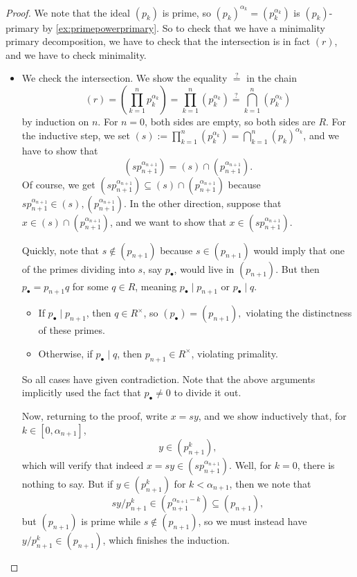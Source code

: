 \begin{proof}
	We note that the ideal $(p_k)$ is prime, so $(p_k)^{\alpha_k}=(p_k^{\alpha_k})$ is $(p_k)$-primary by \autoref{ex:primepowerprimary}. So to check that we have a minimality primary decomposition, we have to check that the intersection is in fact $(r)$, and we have to check minimality. \begin{itemize}
		\item We check the intersection. We show the equality $\stackrel?=$ in the chain
		\[(r)=\left(\prod_{k=1}^np_k^{\alpha_k}\right)=\prod_{k=1}^n\left(p_k^{\alpha_k}\right)\stackrel?=\bigcap_{k=1}^n\left(p_k^{\alpha_k}\right)\]
		by induction on $n$. For $n=0$, both sides are empty, so both sides are $R$. For the inductive step, we set $(s):=\prod_{k=1}^n\left(p_k^{\alpha_k}\right)=\bigcap_{k=1}^n\left(p_k\right)^{\alpha_k}$, and we have to show that
		\[\left(sp_{n+1}^{\alpha_{n+1}}\right)=(s)\cap\left(p_{n+1}^{\alpha_{n+1}}\right).\]
		Of course, we get $\left(sp_{n+1}^{\alpha_{n+1}}\right)\subseteq(s)\cap\left(p_{n+1}^{\alpha_{n+1}}\right)$ because $sp_{n+1}^{\alpha_{n+1}}\in(s),\left(p_{n+1}^{\alpha_{n+1}}\right)$. In the other direction, suppose that $x\in(s)\cap\left(p_{n+1}^{\alpha_{n+1}}\right)$, and we want to show that $x\in\left(sp_{n+1}^{\alpha_{n+1}}\right)$.
		
		Quickly, note that $s\notin(p_{n+1})$ because $s\in(p_{n+1})$ would imply that one of the primes dividing into $s$, say $p_\bullet$, would live in $(p_{n+1})$. But then $p_\bullet=p_{n+1}q$ for some $q\in R$, meaning $p_\bullet\mid p_{n+1}$ or $p_\bullet\mid q$.
		\begin{itemize}
			\item If $p_\bullet\mid p_{n+1}$, then $q\in R^\times$, so $(p_\bullet)=(p_{n+1}),$ violating the distinctness of these primes.
			\item Otherwise, if $p_\bullet\mid q$, then $p_{n+1}\in R^\times$, violating primality.
		\end{itemize}
		So all cases have given contradiction. Note that the above arguments implicitly used the fact that $p_\bullet\ne0$ to divide it out.
		
		Now, returning to the proof, write $x=sy$, and we show inductively that, for $k\in[0,\alpha_{n+1}]$,
		\[y\in\left(p_{n+1}^k\right),\]
		which will verify that indeed $x=sy\in\left(sp_{n+1}^{\alpha_{n+1}}\right)$. Well, for $k=0$, there is nothing to say. But if $y\in\left(p_{n+1}^k\right)$ for $k<\alpha_{n+1}$, then we note that
		\[sy/p_{n+1}^k\in\left(p_{n+1}^{\alpha_{n+1}-k}\right)\subseteq(p_{n+1}),\]
		but $(p_{n+1})$ is prime while $s\notin(p_{n+1})$, so we must instead have $y/p_{n+1}^k\in(p_{n+1})$, which finishes the induction.


\end{itemize}
\end{proof}
